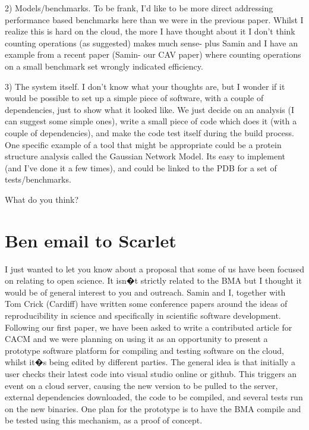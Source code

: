 \documentclass{article}
\begin{document}
 

2) Models/benchmarks. To be frank, I'd like to be more direct
addressing performance based benchmarks here than we were in the
previous paper. Whilst I realize this is hard on the cloud, the more I
have thought about it I don't think counting operations (as suggested)
makes much sense- plus Samin and I have an example from a recent paper
(Samin- our CAV paper) where counting operations on a small benchmark
set wrongly indicated efficiency.

 

3) The system itself. I don't know what your thoughts are, but I
wonder if it would be possible to set up a simple piece of software,
with a couple of dependencies, just to show what it looked like. We
just decide on an analysis (I can suggest some simple ones), write a
small piece of code which does it (with a couple of dependencies), and
make the code test itself during the build process. One specific
example of a tool that might be appropriate could be a protein
structure analysis called the Gaussian Network Model. Its easy to
implement (and I've done it a few times), and could be linked to the
PDB for a set of tests/benchmarks.

 

What do you think?

 


\section{Ben email to Scarlet}
I just wanted to let you know about a proposal that some of us have
been focused on relating to open science. It isn�t strictly related
to the BMA but I thought it would be of general interest to you and
outreach. Samin and I, together with Tom Crick (Cardiff) have written
some conference papers around the ideas of reproducibility in science
and specifically in scientific software development. Following our
first paper, we have been asked to write a contributed article for
CACM and we were planning on using it as an opportunity to present a
prototype software platform for compiling and testing software on the
cloud, whilst it�s being edited by different parties. The general
idea is that initially a user checks their latest code into visual
studio online or github. This triggers an event on a cloud server,
causing the new version to be pulled to the server, external
dependencies downloaded, the code to be compiled, and several tests
run on the new binaries. One plan for the prototype is to have the BMA
compile and be tested using this mechanism, as a proof of concept.
\end{document}
